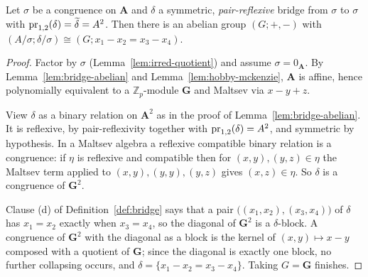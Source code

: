 \begin{lemma}\label{lem:nice-bridge-abelian}
Let $\sigma$ be a congruence on $\mathbf A$ and $\delta$ a symmetric,
\emph{pair-reflexive} bridge from $\sigma$ to $\sigma$ with
$\operatorname*{pr}_{1,2}(\delta)=\widetilde{\delta}=A^{2}$. Then there is an abelian group
$(G;+,-)$ with $(A/\sigma;\delta/\sigma)\cong(G;x_{1}-x_{2}=x_{3}-x_{4})$.
\end{lemma}

\begin{proof}
Factor by $\sigma$ (Lemma~\ref{lem:irred-quotient}) and assume
$\sigma=0_{\mathbf A}$. By Lemma~\ref{lem:bridge-abelian} and
Lemma~\ref{lem:hobby-mckenzie}, $\mathbf A$ is affine, hence polynomially
equivalent to a $\mathbb Z_{p}$-module $\mathbf G$ and Maltsev via $x-y+z$.

View $\delta$ as a binary relation on $\mathbf A^{2}$ as in the proof of
Lemma~\ref{lem:bridge-abelian}. It is reflexive, by pair-reflexivity together
with $\operatorname*{pr}_{1,2}(\delta)=A^{2}$, and symmetric by hypothesis. In a Maltsev
algebra a reflexive compatible binary relation is a congruence: if $\eta$ is
reflexive and compatible then for $(x,y),(y,z)\in\eta$ the Maltsev term applied
to $(x,y),(y,y),(y,z)$ gives $(x,z)\in\eta$. So $\delta$ is a congruence of
$\mathbf G^{2}$.

Clause (d) of Definition~\ref{def:bridge} says that a pair
$\bigl((x_{1},x_{2}),(x_{3},x_{4})\bigr)$ of $\delta$ has $x_{1}=x_{2}$ exactly
when $x_{3}=x_{4}$, so the diagonal of $\mathbf G^{2}$ is a $\delta$-block. A
congruence of $\mathbf G^{2}$ with the diagonal as a block is the kernel of
$(x,y)\mapsto x-y$ composed with a quotient of $\mathbf G$; since the diagonal
is exactly one block, no further collapsing occurs, and
$\delta=\{x_{1}-x_{2}=x_{3}-x_{4}\}$. Taking $G=\mathbf G$ finishes.
\end{proof}

